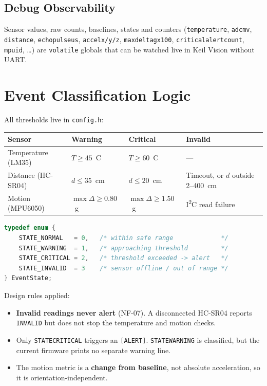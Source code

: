 \documentclass[11pt,a4paper]{article}
\newcommand{\degC}{\textdegree{}C}
\newcommand{\ttu}{\textunderscore}
\begin{document}
\subsection{Debug Observability}
Sensor values, raw counts, baselines, states and counters (\texttt{temperature}, \texttt{adc\ttu mv}, \texttt{distance}, \texttt{echo\ttu pulse\ttu us}, \texttt{accel\ttu x/y/z}, \texttt{max\ttu delta\ttu g\ttu x100}, \texttt{critical\ttu alert\ttu count}, \texttt{mpu\ttu id}, \dots) are \texttt{volatile} globals that can be watched live in Keil \textmu Vision without UART.

\section{Event Classification Logic}
All thresholds live in \texttt{config.h}:

\begin{tabularx}{\textwidth}{@{}L{3.4cm} L{2.8cm} L{2.8cm} X@{}}
\toprule
\textbf{Sensor} & \textbf{Warning} & \textbf{Critical} & \textbf{Invalid}\\
\midrule
Temperature (LM35) & $T\ge 45$~\degC & $T\ge 60$~\degC & ---\\
Distance (HC-SR04) & $d\le 35$~cm & $d\le 20$~cm & Timeout, or $d$ outside 2--400~cm\\
Motion (MPU6050) & $\max\Delta\ge 0.80$~g & $\max\Delta\ge 1.50$~g & I\textsuperscript{2}C read failure\\
\bottomrule
\end{tabularx}

\begin{lstlisting}[language=C]
typedef enum {
    STATE_NORMAL   = 0,   /* within safe range             */
    STATE_WARNING  = 1,   /* approaching threshold         */
    STATE_CRITICAL = 2,   /* threshold exceeded -> alert   */
    STATE_INVALID  = 3    /* sensor offline / out of range */
} EventState;
\end{lstlisting}

Design rules applied:
\begin{itemize}
  \item \textbf{Invalid readings never alert} (NF-07). A disconnected HC-SR04 reports \texttt{INVALID} but does not stop the temperature and motion checks.
  \item Only \texttt{STATE\ttu CRITICAL} triggers an \texttt{[ALERT]}. \texttt{STATE\ttu WARNING} is classified, but the current firmware prints no separate warning line.
  \item The motion metric is a \textbf{change from baseline}, not absolute acceleration, so it is orientation-independent.
\end{itemize}
\end{document}
